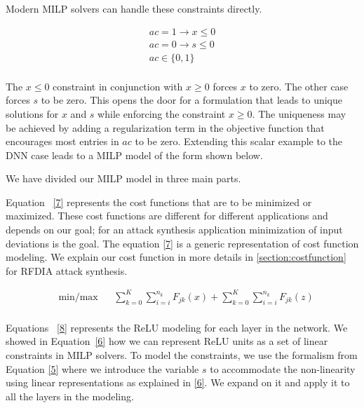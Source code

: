 Modern MILP solvers can handle these constraints directly.

\begin{equation}
\label{6}
\begin{aligned}
ac =  1 \rightarrow x \leq 0  \\
ac =  0 \rightarrow s \leq 0  \\
ac \in \{0,1\} \\
\end{aligned}
\end{equation}

The $x \leq 0$ constraint in conjunction with $x \geq 0$ forces $x$ to zero. The other case forces $s$ to be zero.
This opens the door for a formulation that leads to unique solutions for $x$ and $s$ while enforcing the constraint $x \geq 0$.
The uniqueness may be achieved by adding a regularization term in the objective function that encourages most entries in $ac$ to be zero.
Extending this scalar example to the DNN case leads to a \ac{MILP} model of the form shown below. 


We have divided our \ac{MILP} model in three main parts. 


Equation ~\ref{7} represents the cost functions that are to be minimized or maximized.
These cost functions are different for different applications and depends on our goal; for an attack synthesis application minimization of input deviations is the goal.
The equation \ref{7} is a generic representation of cost function modeling. 
We explain our cost function in more details in \ref{section:costfunction} for \ac{RFDIA} attack synthesis. 

\begin{equation}
\label{7}
\begin{aligned}
& \underset{}{\text{min/max}}
& &  \sum_{k=0}^{K} \sum_{i=i}^{n_k}F_{jk}(x)   + \sum_{k=0}^{K} \sum_{i=i}^{n_k}F_{jk}(z)  \\
\end{aligned}
\end{equation}


Equations ~\ref{8} represents the ReLU modeling for each layer in the network. 
We showed in Equation~\ref{6} how we can represent ReLU units as a set of linear constraints in \ac{MILP} solvers. 
To model the constraints, we use the formalism from Equation \ref{5} where we introduce the variable $s$ to accommodate the non-linearity using linear representations as explained in \ref{6}. 
We expand on it and apply it to all the layers in the modeling.   
 
